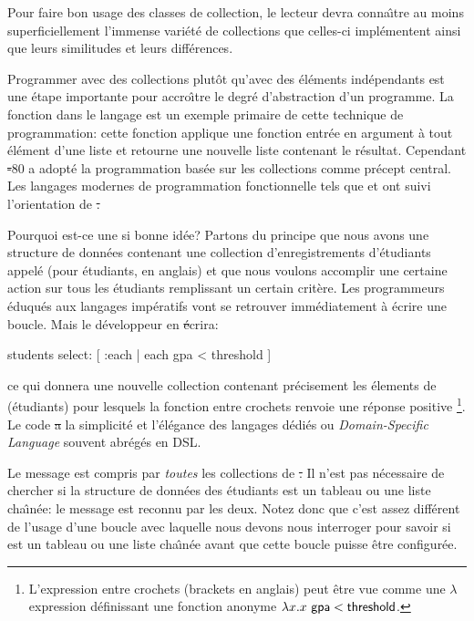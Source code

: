 \documentclass[a4paper,10pt,twoside]{book}
\begin{document}
Pour faire bon usage des classes de collection, le lecteur devra conna\^{\i}tre
au moins superficiellement l'immense vari\'et\'e de collections que celles-ci
impl\'ementent ainsi que leurs similitudes et leurs diff\'erences.

Programmer avec des collections plut\^ot qu'avec des \'el\'ements 
ind\'ependants est une \'etape importante pour accro\^{\i}tre le degr\'e
d'abstraction d'un programme.
La fonction  dans le langage  est un exemple
primaire de cette technique de programmation: cette fonction
applique une fonction entr\'ee en argument \`a tout \'el\'ement d'une
liste et retourne une nouvelle liste contenant le r\'esultat.
Cependant \st-80 a adopt\'e la programmation bas\'ee sur les collections
comme pr\'ecept central.
Les langages modernes de programmation fonctionnelle tels que 
et  ont suivi l'orientation de \st. 

Pourquoi est-ce une si bonne id\'ee?
Partons du principe que nous avons une structure de donn\'ees contenant
une collection d'enregistrements d'\'etudiants appel\'e 
(pour \'etudiants, en anglais) et que nous voulons
accomplir une certaine action sur tous les \'etudiants remplissant un
certain crit\`ere.
Les programmeurs \'eduqu\'es aux langages imp\'eratifs vont se retrouver
imm\'ediatement à écrire une boucle. Mais le développeur en \st \'ecrira:
\begin{code}{}
students select: [ :each | each gpa < threshold ]
\end{code}
\noindent
ce qui donnera une nouvelle collection contenant pr\'ecisement les
\'elements de  (\'etudiants) pour lesquels la
fonction entre crochets renvoie une r\'eponse positive \cad {}\footnote{L'expression entre crochets (brackets en anglais) peut \^etre vue comme une 
$\lambda$ expression d\'efinissant une fonction anonyme $\lambda x. x~{\sf gpa} < {\sf threshold}$.
}.
Le code \st a la simplicit\'e et l'\'el\'egance des langages d\'edi\'es ou \emph{Domain-Specific Language} souvent abr\'eg\'es en DSL. 

Le message  est compris par \emph{toutes} les collections de \st.
Il n'est pas n\'ecessaire de chercher si la structure de donn\'ees des \'etudiants est un tableau ou une liste cha\^{\i}n\'ee: 
le message  est reconnu par les deux. 
Notez donc que c'est assez diff\'erent de l'usage d'une boucle avec laquelle
nous devons nous interroger pour savoir si  est un tableau
ou une liste cha\^{\i}n\'ee avant que cette boucle puisse \^etre configur\'ee.
\end{document}
